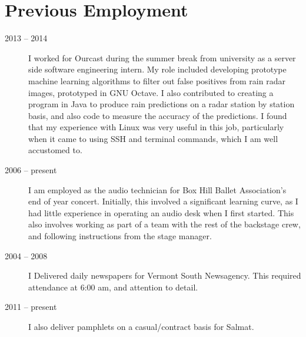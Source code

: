 \documentclass[a4paper]{article}
\begin{document}
\section{Previous Employment}
\begin{description}
    \item[2013 -- 2014] I worked for Ourcast during the summer break from
        university as a server side software engineering intern. My role
        included developing prototype machine learning algorithms to filter
        out false positives from rain radar images, prototyped in GNU 
        Octave. I also contributed to creating a program in Java to produce
        rain predictions on a radar station by station basis, and also code
        to measure the accuracy of the predictions. I found that my
        experience with Linux was very useful in this job, particularly when
        it came to using SSH and terminal commands, which I am well accustomed
        to.
    \item[2006 -- present] I am employed as the audio technician for Box
        Hill Ballet Association's end of year concert. Initially, this 
        involved a significant learning curve, as I had little experience 
        in operating an audio desk when I first started. This also involves 
        working as part of a team with the rest of the backstage crew, and
        following instructions from the stage manager.
    \item[2004 -- 2008] I Delivered daily newspapers for Vermont South
        Newsagency. This required attendance at 6:00 am, and attention to
        detail.
    \item[2011 -- present] I also deliver pamphlets on a casual/contract
        basis for Salmat.
\end{description}
\end{document}
